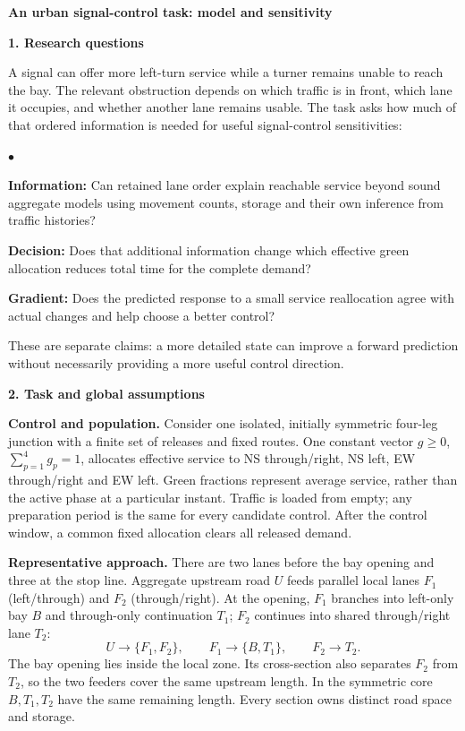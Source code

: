 \documentclass[10pt,a4paper]{article}
\newcommand{\head}[1]{\par\vspace{4pt}\noindent\textbf{#1}\par\nobreak\vspace{1pt}}
\newenvironment{points}{\begin{list}{$\bullet$}{%
 \setlength{\leftmargin}{1.4em}\setlength{\labelwidth}{0.7em}%
 \setlength{\labelsep}{0.4em}\setlength{\itemsep}{2pt}%
 \setlength{\parsep}{0pt}\setlength{\topsep}{3pt}}}{\end{list}}
\begin{document}
\begin{center}
{\large\bfseries An urban signal-control task: model and sensitivity}
\end{center}
\vspace{-5pt}

\head{1. Research questions}
A signal can offer more left-turn service while a turner remains unable
to reach the bay. The relevant obstruction depends on which traffic is
in front, which lane it occupies, and whether another lane remains usable.
The task asks how much of that ordered information is needed for useful
signal-control sensitivities:
\begin{points}
\item \textbf{Information:} Can retained lane order explain reachable
service beyond sound aggregate models using movement counts, storage
and their own inference from traffic histories?
\item \textbf{Decision:} Does that additional information change which
effective green allocation reduces total time for the complete demand?
\item \textbf{Gradient:} Does the predicted response to a small service
reallocation agree with actual changes and help choose a better control?
\end{points}
These are separate claims: a more detailed state can improve a forward
prediction without necessarily providing a more useful control direction.

\head{2. Task and global assumptions}
\textbf{Control and population.} Consider one isolated, initially symmetric
four-leg junction with a finite set of releases and fixed routes.
One constant vector $g\geq0$, $\sum_{p=1}^4g_p=1$, allocates effective
service to NS through/right, NS left, EW through/right and EW left.
Green fractions represent average service, rather than the active phase
at a particular instant. Traffic is loaded from empty; any preparation
period is the same for every candidate control. After the control window,
a common fixed allocation clears all released demand.

\textbf{Representative approach.} There are two lanes before the bay
opening and three at the stop line. Aggregate upstream road $U$ feeds
parallel local lanes $F_1$ (left/through) and $F_2$ (through/right).
At the opening, $F_1$ branches into left-only bay $B$ and through-only
continuation $T_1$; $F_2$ continues into shared through/right lane $T_2$:
\[
 U\longrightarrow\{F_1,F_2\},\qquad
 F_1\longrightarrow\{B,T_1\},\qquad F_2\longrightarrow T_2.
\]
The bay opening lies inside the local zone. Its cross-section also
separates $F_2$ from $T_2$, so the two feeders cover the same upstream
length. In the symmetric core $B,T_1,T_2$ have the same remaining length.
Every section owns distinct road space and storage.
\end{document}

